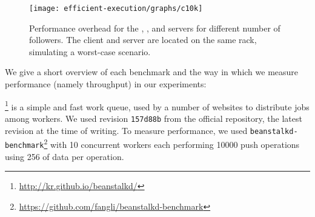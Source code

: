 


\begin{figure}[!t]
 \centering
 \texttt{[image: efficient-execution/graphs/c10k]}
 \caption{Performance overhead for the \beanstalkd, \lighttpd, \nginx
   and \redis servers for different number of followers.  The client
   and server are located on the same rack, simulating a worst-case scenario.}
 \label{fig:servers}
\end{figure}

We give a short overview of each benchmark and the way in which we
measure performance (namely throughput) in our experiments:

\boldtext{\beanstalkd}\footnote{\url{http://kr.github.io/beanstalkd/}}
is a simple and fast work queue, used by a number of websites to
distribute jobs among workers. We used revision \lstinline`157d88b` from the
official \git repository, the latest revision at the time of
writing.  To measure performance, we used
\lstinline`beanstalkd-benchmark`\footnote{\url{https://github.com/fangli/beanstalkd-benchmark}}
with \num{10} concurrent workers each performing \num{10000} push operations
using \SI{256}{\byte} of data per operation.


